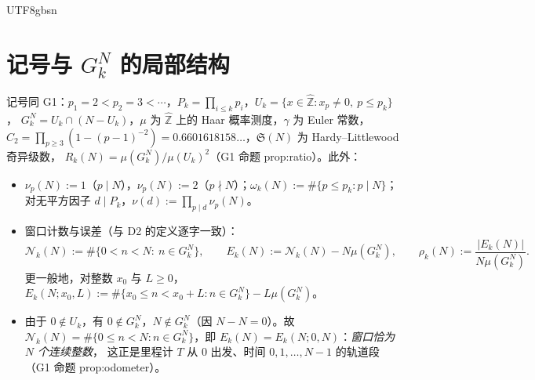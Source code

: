 \documentclass[11pt,a4paper]{article}
\newcommand{\Zhat}{\widehat{\mathbb Z}}
\newcommand{\Haar}{\mu}
\newcommand{\Sing}{\mathfrak S}
\newcommand{\Cnt}{\mathcal N}          %
\theoremstyle{plain}
\theoremstyle{definition}
\begin{document}
\begin{CJK}{UTF8}{gbsn}
\section{记号与 $G_k^N$ 的局部结构}\label{sec:notation}

记号同 G1：$p_1=2<p_2=3<\cdots$，$P_k=\prod_{i\le k}p_i$，$U_k=\{x\in\Zhat:x_p\ne0,\ p\le p_k\}$，
$G_k^N=U_k\cap(N-U_k)$，$\Haar$ 为 $\Zhat$ 上的 Haar 概率测度，$\gamma$ 为 Euler 常数，
$C_2=\prod_{p\ge3}(1-(p-1)^{-2})=0.6601618158\ldots$，$\Sing(N)$ 为 Hardy--Littlewood 奇异级数，
$R_k(N)=\Haar(G_k^N)/\Haar(U_k)^2$（G1 命题 prop:ratio）。此外：
\begin{itemize}[leftmargin=*]
\item $\nu_p(N):=1$（$p\mid N$），$\nu_p(N):=2$（$p\nmid N$）；$\omega_k(N):=\#\{p\le p_k:p\mid N\}$；
对无平方因子 $d\mid P_k$，$\nu(d):=\prod_{p\mid d}\nu_p(N)$。
\item 窗口计数与误差（与 D2 的定义逐字一致）：
\[
\Cnt_k(N):=\#\{0<n<N:\ n\in G_k^N\},\qquad
E_k(N):=\Cnt_k(N)-N\Haar(G_k^N),\qquad
\rho_k(N):=\frac{|E_k(N)|}{N\Haar(G_k^N)} .
\]
更一般地，对整数 $x_0$ 与 $L\ge0$，$E_k(N;x_0,L):=\#\{x_0\le n<x_0+L:n\in G_k^N\}-L\Haar(G_k^N)$。
\item 由于 $0\notin U_k$，有 $0\notin G_k^N$，$N\notin G_k^N$（因 $N-N=0$）。故
$\Cnt_k(N)=\#\{0\le n<N:n\in G_k^N\}$，即 $E_k(N)=E_k(N;0,N)$：\emph{窗口恰为 $N$ 个连续整数}，
这正是里程计 $T$ 从 $0$ 出发、时间 $0,1,\dots,N-1$ 的轨道段（G1 命题 prop:odometer）。
\end{itemize}


\end{CJK}
\end{document}
